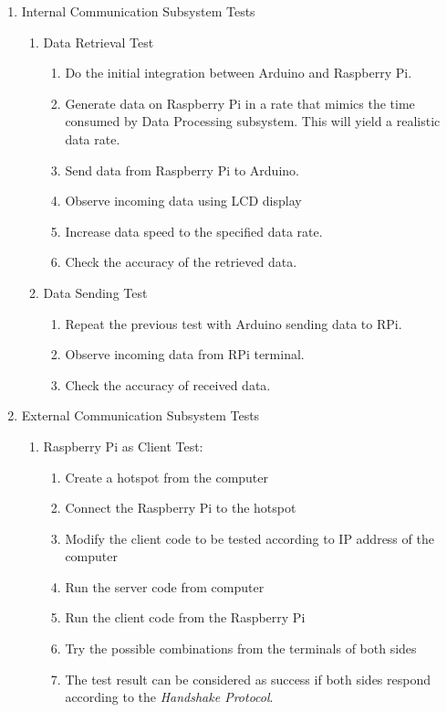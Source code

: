 \documentclass[a4paper,12pt]{article}
\begin{document}
\begin{enumerate}
\begin{enumerate}
		\item {Internal Communication Subsystem Tests}
		\begin{enumerate}
			 \item Data Retrieval Test
			\begin{enumerate}
				\item Do the initial integration between Arduino and Raspberry Pi.
				\item Generate data on Raspberry Pi in a rate that mimics the time consumed by Data Processing subsystem. This will yield a realistic data rate.  
				\item Send data from Raspberry Pi to Arduino. 
				\item Observe incoming data using LCD display
				\item Increase data speed to the specified data rate.  
				\item Check the accuracy of the retrieved data. 
			\end{enumerate}
			 \item Data Sending Test
			 \begin{enumerate}
			 	\item Repeat the previous test with Arduino sending data to RPi.
			 	\item Observe incoming data from RPi terminal.
			 	\item Check the accuracy of received data.
			 \end{enumerate}
		\end{enumerate}
	 
	
	
	\item {External Communication Subsystem Tests}
		
		
\begin{enumerate}
		
		\item Raspberry Pi as Client Test:

			\begin{enumerate}
				\item Create a hotspot from the computer  
				\item Connect the Raspberry Pi to the hotspot  
				\item Modify the client code to be tested according to IP address of the computer
				\item Run the server code from computer  
				\item Run the client code from the Raspberry Pi  
				\item Try the possible combinations from the terminals of both sides  
				\item The test result can be considered as success if both sides respond according to the \textit{Handshake Protocol}.
			\end{enumerate}		
		

\end{enumerate}
\end{enumerate}
\end{enumerate}
\end{document}
